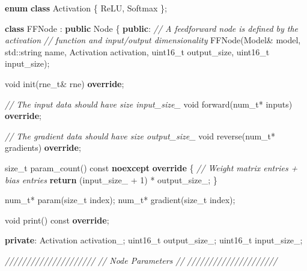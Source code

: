 \documentclass[
]{article}
\newenvironment{Shaded}{}{}
\newcommand{\AttributeTok}[1]{\textcolor[rgb]{0.49,0.56,0.16}{#1}}
\newcommand{\BuiltInTok}[1]{#1}
\newcommand{\CommentTok}[1]{\textcolor[rgb]{0.38,0.63,0.69}{\textit{#1}}}
\newcommand{\ControlFlowTok}[1]{\textcolor[rgb]{0.00,0.44,0.13}{\textbf{#1}}}
\newcommand{\DataTypeTok}[1]{\textcolor[rgb]{0.56,0.13,0.00}{#1}}
\newcommand{\DecValTok}[1]{\textcolor[rgb]{0.25,0.63,0.44}{#1}}
\newcommand{\KeywordTok}[1]{\textcolor[rgb]{0.00,0.44,0.13}{\textbf{#1}}}
\newcommand{\NormalTok}[1]{#1}
\newcommand{\VariableTok}[1]{\textcolor[rgb]{0.10,0.09,0.49}{#1}}
\begin{document}
\begin{Shaded}
\begin{Highlighting}[]
\KeywordTok{enum} \KeywordTok{class}\NormalTok{ Activation}
\NormalTok{\{}
\NormalTok{    ReLU,}
\NormalTok{    Softmax}
\NormalTok{\};}

\KeywordTok{class}\NormalTok{ FFNode : }\KeywordTok{public}\NormalTok{ Node}
\NormalTok{\{}
\KeywordTok{public}\NormalTok{:}
    \CommentTok{// A feedforward node is defined by the activation}
    \CommentTok{// function and input/output dimensionality}
\NormalTok{    FFNode(Model\& model,}
           \BuiltInTok{std::}\NormalTok{string name,}
\NormalTok{           Activation activation,}
           \DataTypeTok{uint16\_t}\NormalTok{ output\_size,}
           \DataTypeTok{uint16\_t}\NormalTok{ input\_size);}

    \DataTypeTok{void}\NormalTok{ init(}\DataTypeTok{rne\_t}\NormalTok{\& rne) }\KeywordTok{override}\NormalTok{;}

    \CommentTok{// The input data should have size input\_size\_}
    \DataTypeTok{void}\NormalTok{ forward(}\DataTypeTok{num\_t}\NormalTok{* inputs) }\KeywordTok{override}\NormalTok{;}

    \CommentTok{// The gradient data should have size output\_size\_}
    \DataTypeTok{void}\NormalTok{ reverse(}\DataTypeTok{num\_t}\NormalTok{* gradients) }\KeywordTok{override}\NormalTok{;}

    \DataTypeTok{size\_t}\NormalTok{ param\_count() }\AttributeTok{const} \KeywordTok{noexcept} \KeywordTok{override}
\NormalTok{    \{}
        \CommentTok{// Weight matrix entries + bias entries}
        \ControlFlowTok{return}\NormalTok{ (}\VariableTok{input\_size\_}\NormalTok{ + }\DecValTok{1}\NormalTok{) * }\VariableTok{output\_size\_}\NormalTok{;}
\NormalTok{    \}}

    \DataTypeTok{num\_t}\NormalTok{* param(}\DataTypeTok{size\_t}\NormalTok{ index);}
    \DataTypeTok{num\_t}\NormalTok{* gradient(}\DataTypeTok{size\_t}\NormalTok{ index);}

    \DataTypeTok{void}\NormalTok{ print() }\AttributeTok{const} \KeywordTok{override}\NormalTok{;}

\KeywordTok{private}\NormalTok{:}
\NormalTok{    Activation }\VariableTok{activation\_}\NormalTok{;}
    \DataTypeTok{uint16\_t} \VariableTok{output\_size\_}\NormalTok{;}
    \DataTypeTok{uint16\_t} \VariableTok{input\_size\_}\NormalTok{;}

    \CommentTok{/////////////////////}
    \CommentTok{// Node Parameters //}
    \CommentTok{/////////////////////}


\end{Highlighting}
\end{Shaded}
\end{document}
